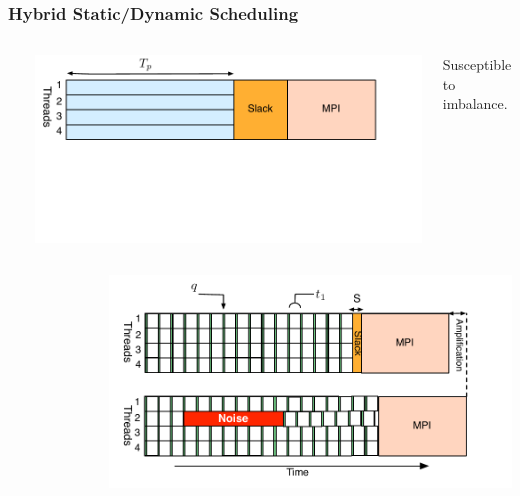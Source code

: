{\begin{frame}[label=hybridstatdyn]
\frametitle{Hybrid Static/Dynamic Scheduling}
\begin{columns}
  \vspace*{-0.2in}
\begin{lstlisting}
  
  \end{lstlisting}
 \vspace*{-0.2in}
  \begin{center}
    \includegraphics[scale=0.31]{images/threadedCompRegion-static}
  \end{center} 
  \vspace*{-0.4in}
  \begin{center} 
    \tiny Susceptible to imbalance.  
  \end{center} 
\end{columns}
\begin{columns}
\vspace*{-0.15in}
\begin{figure}

\end{figure}
  \begin{center}
    \includegraphics[scale=0.31]{images/threadedCompRegion-dynamic}

\end{center}
\end{columns}
\end{frame}}
